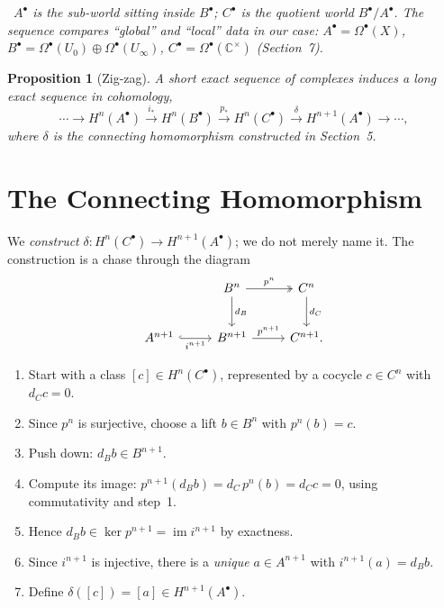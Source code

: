 \documentclass[11pt]{article}
\newcommand{\CC}{\mathbb C}
\newcommand{\im}{\operatorname{im}}
\newcommand{\kerop}{\operatorname{ker}}
\newcommand{\diagnose}[1]{%
  \par\smallskip\noindent{\color{accent}\textbf{Diagnosis.}}\ \emph{#1}\par\smallskip}
\theoremstyle{plain}
\newtheorem{proposition}{Proposition}
\theoremstyle{definition}
\begin{document}
\diagnose{$A^\bullet$ is the sub-world sitting inside $B^\bullet$; $C^\bullet$ is
the quotient world $B^\bullet/A^\bullet$. The sequence compares ``global'' and
``local'' data in our case: $A^\bullet=\Omega^\bullet(X)$, $B^\bullet=
\Omega^\bullet(U_0)\oplus\Omega^\bullet(U_\infty)$, $C^\bullet=\Omega^\bullet(\CC^\times)$
(Section~7).}

\begin{proposition}[Zig-zag]\label{prop:zigzag}
A short exact sequence of complexes induces a long exact sequence in cohomology,
\[
  \cdots\to H^n(A^\bullet)\xrightarrow{i_*}H^n(B^\bullet)\xrightarrow{p_*}
  H^n(C^\bullet)\xrightarrow{\ \delta\ }H^{n+1}(A^\bullet)\to\cdots,
\]
where $\delta$ is the connecting homomorphism constructed in Section~5.
\end{proposition}

\section{The Connecting Homomorphism}
We \emph{construct} $\delta\colon H^n(C^\bullet)\to H^{n+1}(A^\bullet)$; we do not
merely name it. The construction is a chase through the diagram
\[
\begin{tikzcd}[row sep=2.4em, column sep=2.6em]
& B^n \arrow[r,"p^n", two heads] \arrow[d,"d_B"] & C^n \arrow[d,"d_C"] \\
A^{n+1} \arrow[r,"i^{n+1}"', hook] & B^{n+1} \arrow[r,"p^{n+1}"] & C^{n+1}.
\end{tikzcd}
\]
\begin{enumerate}
  \item Start with a class $[c]\in H^n(C^\bullet)$, represented by a cocycle
        $c\in C^n$ with $d_Cc=0$.
  \item Since $p^n$ is surjective, choose a lift $b\in B^n$ with $p^n(b)=c$.
  \item Push down: $d_Bb\in B^{n+1}$.
  \item Compute its image: $p^{n+1}(d_Bb)=d_C\,p^n(b)=d_Cc=0$, using commutativity
        and step~1.
  \item Hence $d_Bb\in\kerop p^{n+1}=\im i^{n+1}$ by exactness.
  \item Since $i^{n+1}$ is injective, there is a \emph{unique} $a\in A^{n+1}$ with
        $i^{n+1}(a)=d_Bb$.
  \item Define $\delta([c])=[a]\in H^{n+1}(A^\bullet)$.
\end{enumerate}
\end{document}
